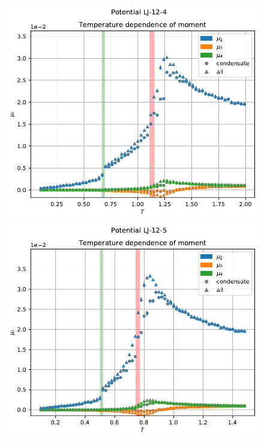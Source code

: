\documentclass[pdf,hyperref={unicode}]{beamer}
\begin{document}
\begin{frame}
\transdissolve[duration=0.2]

\begin{figure}[h]
\begin{center}
\begin{minipage}[h]{0.35\linewidth}
\includegraphics[width=\textwidth, keepaspectratio]{plot_moment_Potential LJ-12-4_1}
\end{minipage}
\begin{minipage}[h]{0.35\linewidth}
\includegraphics[width=\textwidth, keepaspectratio]{plot_moment_Potential LJ-12-5_1}
\end{minipage}



\end{center}
\end{figure}
\end{frame}
\end{document}

